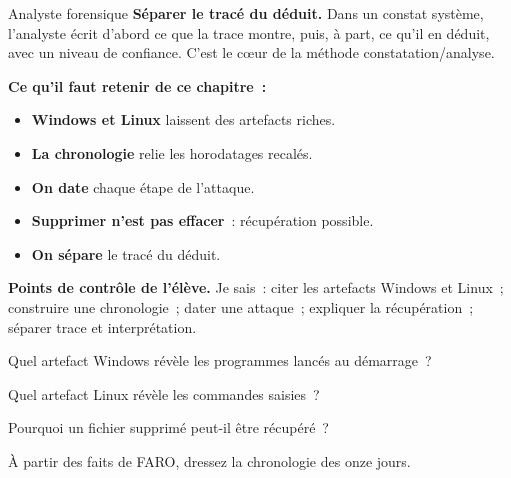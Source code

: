 \begin{boxmetier}{Analyste forensique}
\textbf{Séparer le tracé du déduit.} Dans un constat système, l'analyste
écrit d'abord ce que la trace montre, puis, à part, ce qu'il en déduit, avec
un niveau de confiance. C'est le cœur de la méthode constatation/analyse.
\end{boxmetier}

\separateur

\begin{boxresume}
\textbf{Ce qu'il faut retenir de ce chapitre~:}
\begin{itemize}
    \item \textbf{Windows et Linux} laissent des artefacts riches.
    \item \textbf{La chronologie} relie les horodatages recalés.
    \item \textbf{On date} chaque étape de l'attaque.
    \item \textbf{Supprimer n'est pas effacer}~: récupération possible.
    \item \textbf{On sépare} le tracé du déduit.
\end{itemize}
\end{boxresume}

\begin{boxinfo}
\textbf{Points de contrôle de l'élève.} Je sais~: citer les artefacts Windows
et Linux~; construire une chronologie~; dater une attaque~; expliquer la
récupération~; séparer trace et interprétation.
\end{boxinfo}

\bigskip

\begin{boxexo}[title={\ding{45}\quad Exercice~12.1. Artefact Windows \niveaubase}]
Quel artefact Windows révèle les programmes lancés au démarrage~?
\end{boxexo}

\begin{boxexo}[title={\ding{45}\quad Exercice~12.2. Artefact Linux \niveaubase}]
Quel artefact Linux révèle les commandes saisies~?
\end{boxexo}

\begin{boxexo}[title={\ding{45}\quad Exercice~12.3. Suppression \niveaubase}]
Pourquoi un fichier supprimé peut-il être récupéré~?
\end{boxexo}

\begin{boxexo}[title={\ding{45}\quad Exercice~12.4. Chronologie \niveaumoyen}]
À partir des faits de FARO, dressez la chronologie des onze jours.
\end{boxexo}

